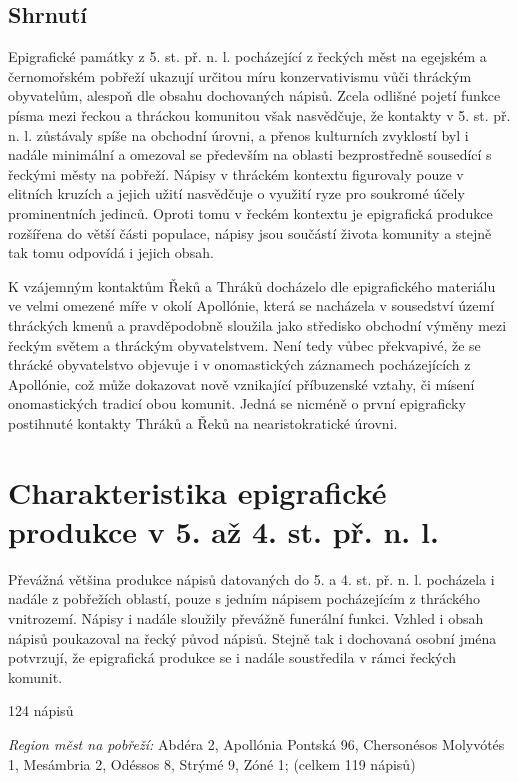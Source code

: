 \subsection[shrnutí-5]{Shrnutí}

Epigrafické památky z 5. st. př. n. l. pocházející z řeckých měst na egejském a černomořském pobřeží ukazují určitou míru konzervativismu vůči thráckým obyvatelům, alespoň dle obsahu dochovaných nápisů. Zcela odlišné pojetí funkce písma mezi řeckou a thráckou komunitou však nasvědčuje, že kontakty v 5. st. př. n. l. zůstávaly spíše na obchodní úrovni, a přenos kulturních zvyklostí byl i nadále minimální a omezoval se především na oblasti bezprostředně sousedící s řeckými městy na pobřeží. Nápisy v thráckém kontextu figurovaly pouze v elitních kruzích a jejich užití nasvědčuje o využití ryze pro soukromé účely prominentních jedinců. Oproti tomu v řeckém kontextu je epigrafická produkce rozšířena do větší části populace, nápisy jsou součástí života komunity a stejně tak tomu odpovídá i jejich obsah.

K vzájemným kontaktům Řeků a Thráků docházelo dle epigrafického materiálu ve velmi omezené míře v okolí Apollónie, která se nacházela v sousedství území thráckých kmenů a pravděpodobně sloužila jako středisko obchodní výměny mezi řeckým světem a thráckým obyvatelstvem. Není tedy vůbec překvapivé, že se thrácké obyvatelstvo objevuje i v onomastických záznamech pocházejících z Apollónie, což může dokazovat nově vznikající příbuzenské vztahy, či mísení onomastických tradicí obou komunit. Jedná se nicméně o první epigraficky postihnuté kontakty Thráků a Řeků na nearistokratické úrovni.

\section[charakteristika-epigrafické-produkce-v-5.-až-4.-st.-př.-n.-l.]{Charakteristika epigrafické produkce v 5. až 4. st. př. n. l.}

Převážná většina produkce nápisů datovaných do 5. a 4. st. př. n. l. pocházela i nadále z pobřežích oblastí, pouze s jedním nápisem pocházejícím z thráckého vnitrozemí. Nápisy i nadále sloužily převážně funerální funkci. Vzhled i obsah nápisů poukazoval na řecký původ nápisů. Stejně tak i dochovaná osobní jména potvrzují, že epigrafická produkce se i nadále soustředila v rámci řeckých komunit.

\placetable[none]{}
\starttable[|l|]
\HL
{} 124 nápisů

{\em Region měst na pobřeží:} Abdéra 2, Apollónia Pontská 96, Chersonésos Molyvótés 1, Mesámbria 2, Odéssos 8, Strýmé 9, Zóné 1; (celkem 119 nápisů)

